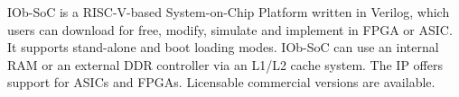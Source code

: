 IOb-SoC is a RISC-V-based System-on-Chip Platform written in Verilog, which
users can download for free, modify, simulate and implement in FPGA or ASIC. It
supports stand-alone and boot loading modes. IOb-SoC can use an internal RAM or
an external DDR controller via an L1/L2 cache system. The IP offers support for
ASICs and FPGAs. Licensable commercial versions are available.
